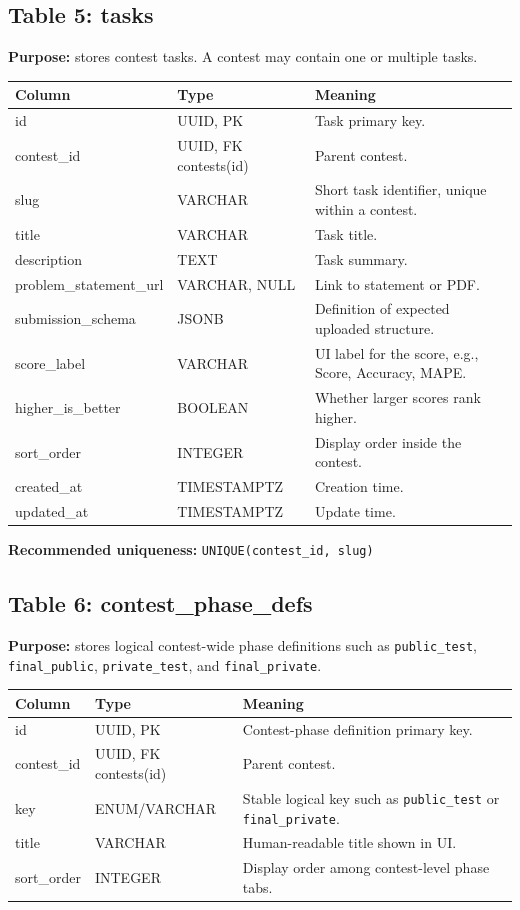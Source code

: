 \documentclass[11pt,a4paper]{article}
\begin{document}
\subsection{Table 5: tasks}
\textbf{Purpose:} stores contest tasks. A contest may contain one or multiple tasks.

\begin{longtable}{>{\raggedright\arraybackslash}p{} >{\raggedright\arraybackslash}p{} >{\raggedright\arraybackslash}p{}}
\toprule
\textbf{Column} & \textbf{Type} & \textbf{Meaning} \\
\midrule
id & UUID, PK & Task primary key. \\
contest\_id & UUID, FK contests(id) & Parent contest. \\
slug & VARCHAR & Short task identifier, unique within a contest. \\
title & VARCHAR & Task title. \\
description & TEXT & Task summary. \\
problem\_statement\_url & VARCHAR, NULL & Link to statement or PDF. \\
submission\_schema & JSONB & Definition of expected uploaded structure. \\
score\_label & VARCHAR & UI label for the score, e.g., Score, Accuracy, MAPE. \\
higher\_is\_better & BOOLEAN & Whether larger scores rank higher. \\
sort\_order & INTEGER & Display order inside the contest. \\
created\_at & TIMESTAMPTZ & Creation time. \\
updated\_at & TIMESTAMPTZ & Update time. \\
\bottomrule
\end{longtable}

\textbf{Recommended uniqueness:} \texttt{UNIQUE(contest\_id, slug)}

\subsection{Table 6: contest\_phase\_defs}
\textbf{Purpose:} stores logical contest-wide phase definitions such as \texttt{public\_test}, \texttt{final\_public}, \texttt{private\_test}, and \texttt{final\_private}.

\begin{longtable}{>{\raggedright\arraybackslash}p{} >{\raggedright\arraybackslash}p{} >{\raggedright\arraybackslash}p{}}
\toprule
\textbf{Column} & \textbf{Type} & \textbf{Meaning} \\
\midrule
id & UUID, PK & Contest-phase definition primary key. \\
contest\_id & UUID, FK contests(id) & Parent contest. \\
key & ENUM/VARCHAR & Stable logical key such as \texttt{public\_test} or \texttt{final\_private}. \\
title & VARCHAR & Human-readable title shown in UI. \\
sort\_order & INTEGER & Display order among contest-level phase tabs. \\
\bottomrule
\end{longtable}
\end{document}
